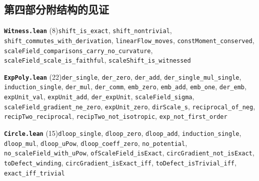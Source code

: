 \documentclass[11pt,a4paper]{article}
\theoremstyle{sudef}
\begin{document}
\subsection*{第四部分附\quad 结构的见证}
\noindent\textbf{\texttt{Witness.lean}} (8)\quad \texttt{shift\_\allowbreak is\_\allowbreak exact}, \texttt{shift\_\allowbreak nontrivial}, \texttt{shift\_\allowbreak commutes\_\allowbreak with\_\allowbreak derivation}, \texttt{linearFlow\_\allowbreak moves}, \texttt{constMoment\_\allowbreak conserved}, \texttt{scaleField\_\allowbreak comparisons\_\allowbreak carry\_\allowbreak no\_\allowbreak curvature}, \texttt{scaleField\_\allowbreak scale\_\allowbreak is\_\allowbreak faithful}, \texttt{scaleShift\_\allowbreak is\_\allowbreak witnessed}\par\smallskip
\noindent\textbf{\texttt{ExpPoly.lean}} (22)\quad \texttt{der\_\allowbreak single}, \texttt{der\_\allowbreak zero}, \texttt{der\_\allowbreak add}, \texttt{der\_\allowbreak single\_\allowbreak mul\_\allowbreak single}, \texttt{induction\_\allowbreak single}, \texttt{der\_\allowbreak mul}, \texttt{der\_\allowbreak comm}, \texttt{emb\_\allowbreak zero}, \texttt{emb\_\allowbreak add}, \texttt{emb\_\allowbreak one}, \texttt{der\_\allowbreak emb}, \texttt{expUnit\_\allowbreak val}, \texttt{expUnit\_\allowbreak add}, \texttt{der\_\allowbreak expUnit}, \texttt{scaleField\_\allowbreak sigma}, \texttt{scaleField\_\allowbreak gradient\_\allowbreak ne\_\allowbreak zero}, \texttt{expUnit\_\allowbreak zero}, \texttt{dirScale\_\allowbreak s}, \texttt{reciprocal\_\allowbreak of\_\allowbreak neg}, \texttt{recipTwo\_\allowbreak reciprocal}, \texttt{recipTwo\_\allowbreak not\_\allowbreak isotropic}, \texttt{exp\_\allowbreak not\_\allowbreak first\_\allowbreak order}\par\smallskip
\noindent\textbf{\texttt{Circle.lean}} (15)\quad \texttt{dloop\_\allowbreak single}, \texttt{dloop\_\allowbreak zero}, \texttt{dloop\_\allowbreak add}, \texttt{induction\_\allowbreak single}, \texttt{dloop\_\allowbreak mul}, \texttt{dloop\_\allowbreak uPow}, \texttt{dloop\_\allowbreak coeff\_\allowbreak zero}, \texttt{no\_\allowbreak potential}, \texttt{no\_\allowbreak scaleField\_\allowbreak with\_\allowbreak uPow}, \texttt{ofScaleField\_\allowbreak isExact}, \texttt{circGradient\_\allowbreak not\_\allowbreak isExact}, \texttt{toDefect\_\allowbreak winding}, \texttt{circGradient\_\allowbreak isExact\_\allowbreak iff}, \texttt{toDefect\_\allowbreak isTrivial\_\allowbreak iff}, \texttt{exact\_\allowbreak iff\_\allowbreak trivial}\par\smallskip
\end{document}
